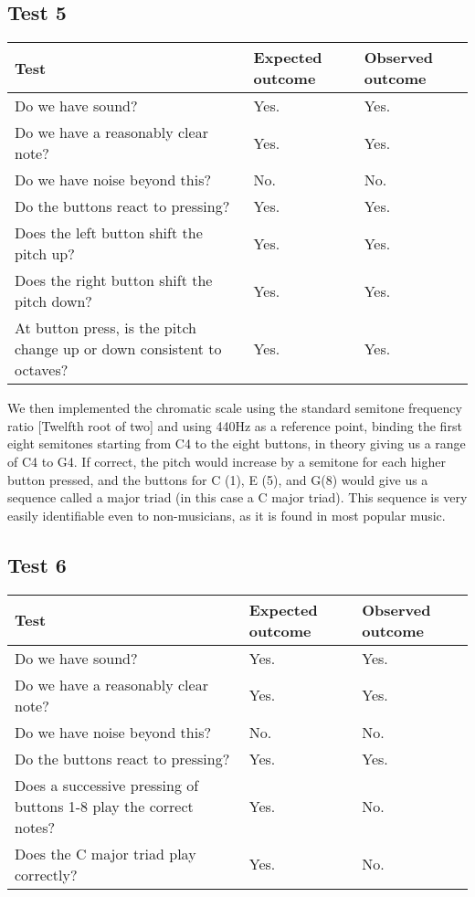 \subsection*{Test 5}
\begin{center}
\begin{tabular}{|p{3.6cm}|p{3.6cm}|p{3.6cm}|}
\hline
{\sc Test} & {\sc Expected outcome} & {\sc Observed outcome}\\ \hline
Do we have sound? & Yes. & Yes. \\ \hline
Do we have a reasonably clear note? & Yes. & Yes. \\ \hline
Do we have noise beyond this? & No. & No. \\ \hline
Do the buttons react to pressing? & Yes. & Yes. \\ \hline
Does the left button shift the pitch up? & Yes. & Yes. \\ \hline
Does the right button shift the pitch down? & Yes. & Yes. \\ \hline
At button press, is the pitch change up or down consistent to octaves? &
Yes. & Yes. \\ \hline
\end{tabular}
\end{center}

We then implemented the chromatic scale using the standard semitone
frequency ratio [Twelfth root of two] and using 440Hz as a reference
point, binding the first eight semitones starting from C4 to the eight
buttons, in theory giving us a range of C4 to G4. If correct, the pitch
would increase by a semitone for each higher button pressed, and the
buttons for C (1), E (5), and G(8) would give us a sequence called a
major triad (in this case a C major triad). This sequence is very easily identifiable even to
non-musicians, as it is found in most popular music.

\subsection*{Test 6}
\begin{center}
\begin{tabular}{|p{3.6cm}|p{3.6cm}|p{3.6cm}|}
\hline
{\sc Test} & {\sc Expected outcome} & {\sc Observed outcome}\\ \hline
Do we have sound? & Yes. & Yes.\\ \hline
Do we have a reasonably clear note? & Yes. & Yes. \\ \hline
Do we have noise beyond this? & No. & No. \\ \hline
Do the buttons react to pressing? & Yes. & Yes.\\ \hline
Does a successive pressing of buttons 1-8 play the correct notes? & Yes. & No.\\ \hline
Does the C major triad play correctly? & Yes. & No.\\ \hline
\end{tabular}
\end{center}

